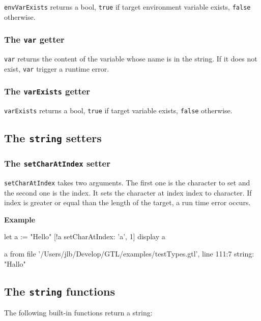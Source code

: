 \documentclass[10pt,openright,twosides,final]{memoir}
\newcommand{\gtlarg}[1]{{\footnotesize\ttfamily\colorbox{light-blue}{#1}}}
\newcommand{\gtlinline}[1]{\colorbox{light-blue}{\lstinline[language=gtl]{#1}}}
\newcommand{\example}{\vspace{.75em}\noindent\textbf{Example}\vspace{0em}}
\begin{document}
\gtlinline{envVarExists} returns a bool, \gtlinline{true} if target environment variable exists, \gtlinline{false} otherwise.

\subsubsection{The \texttt{var} getter}

\gtlinline{var} returns the content of the variable whose name is in the string. If it does not exist, \gtlinline{var} trigger a runtime error.

\subsubsection{The \texttt{varExists} getter}

\gtlinline{varExists} returns a bool, \gtlinline{true} if target  variable exists, \gtlinline{false} otherwise.

\subsection{The \texttt{string} setters}

\subsubsection{The \texttt{setCharAtIndex} setter}

\gtlinline{setCharAtIndex} takes two arguments. The first one is the \gtlarg{character} to set and the second one is the \gtlarg{index}. It sets the character at index \gtlarg{index} to \gtlarg{character}. If \gtlarg{index} is greater or equal than the length of the target, a run time error occurs.

\example
\begin{gtl}
let a := "Hello"
[!a setCharAtIndex: 'a', 1]
display a
\end{gtl}
\begin{console}
a from file '/Users/jlb/Develop/GTL/examples/testTypes.gtl', line 111:7
    string: "Hallo"
\end{console}

\subsection{The \texttt{string} functions}

The following built-in functions return a string:

\end{document}
